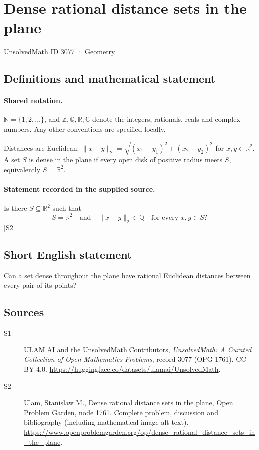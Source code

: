 \documentclass[11pt]{book}
\newcommand{\sref}[2]{\hyperlink{source:#1:#2}{[S#2]}}
\begin{document}
\setcounter{section}{3076}
\section{Dense rational distance sets in the plane}\label{3077}
{\small\sffamily UnsolvedMath ID 3077 · Geometry}
\subsection{Definitions and mathematical statement}

\paragraph{Shared notation.}$\mathbb N=\{1,2,\ldots\}$, and $\mathbb Z,\mathbb Q,\mathbb R,\mathbb C$ denote the integers, rationals, reals and complex numbers. Any other conventions are specified locally.


Distances are Euclidean: $\|x-y\|_2=\sqrt{(x_1-y_1)^2+(x_2-y_2)^2}$ for $x,y\in\mathbb R^2$. A set $S$ is dense in the plane if every open disk of positive radius meets $S$, equivalently $\overline S=\mathbb R^2$.
\paragraph{Statement recorded in the supplied source.}
Is there $S\subseteq\mathbb R^2$ such that
\[\overline S=\mathbb R^2\quad\text{and}\quad\|x-y\|_2\in\mathbb Q\quad\text{for every }x,y\in S?\] \sref{3077}{2}
\subsection{Short English statement}
Can a set dense throughout the plane have rational Euclidean distances between every pair of its points?
\subsection{Sources}
\begin{description}
\item[\hypertarget{source:3077:1}{S1}] ULAM.AI and the UnsolvedMath Contributors, \emph{UnsolvedMath: A Curated Collection of Open Mathematics Problems}, record 3077 (OPG-1761). CC BY 4.0. \url{https://huggingface.co/datasets/ulamai/UnsolvedMath}.
\item[\hypertarget{source:3077:2}{S2}] Ulam, Stanislaw M., Dense rational distance sets in the plane, Open Problem Garden, node 1761. Complete problem, discussion and bibliography (including mathematical image alt text). \url{https://www.openproblemgarden.org/op/dense_rational_distance_sets_in_the_plane}.
\end{description}
\label{end:3077}
\end{document}
